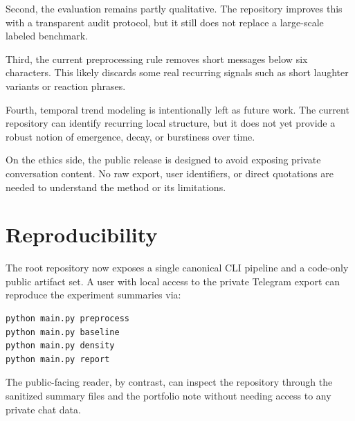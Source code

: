 \documentclass{bmvc2k}
\begin{document}
Second, the evaluation remains partly qualitative. The repository improves this with a transparent audit protocol, but it still does not replace a large-scale labeled benchmark.

Third, the current preprocessing rule removes short messages below six characters. This likely discards some real recurring signals such as short laughter variants or reaction phrases.

Fourth, temporal trend modeling is intentionally left as future work. The current repository can identify recurring local structure, but it does not yet provide a robust notion of emergence, decay, or burstiness over time.

On the ethics side, the public release is designed to avoid exposing private conversation content. No raw export, user identifiers, or direct quotations are needed to understand the method or its limitations.

\section{Reproducibility}

The root repository now exposes a single canonical CLI pipeline and a code-only public artifact set. A user with local access to the private Telegram export can reproduce the experiment summaries via:
\begin{verbatim}
python main.py preprocess
python main.py baseline
python main.py density
python main.py report
\end{verbatim}

The public-facing reader, by contrast, can inspect the repository through the sanitized summary files and the portfolio note without needing access to any private chat data.


\end{document}
